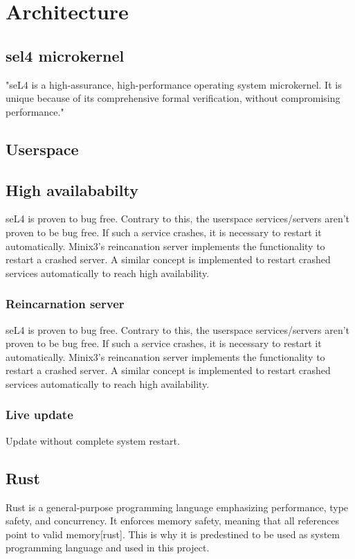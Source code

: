 \section{Architecture}


\subsection{sel4 microkernel}
"seL4 is a high-assurance, high-performance operating system microkernel. It is unique because of its comprehensive formal verification, without compromising performance." \cite{seL4:2024}

\subsection{Userspace}

\subsection{High availababilty}
seL4 is proven to bug free. Contrary to this, the userspace services/servers aren't proven to be bug free. If such a service crashes, it is necessary to restart it automatically.
Minix3's reincanation server \cite{minix3:2010} implements the functionality to restart a crashed server. A similar concept is implemented to restart crashed services automatically to reach 
high availability.

\subsubsection{Reincarnation server}
seL4 is proven to bug free. Contrary to this, the userspace services/servers aren't proven to be bug free. If such a service crashes, it is necessary to restart it automatically.
Minix3's reincanation server \cite{minix3:2010} implements the functionality to restart a crashed server. A similar concept is implemented to restart crashed services automatically to reach 
high availability.

\subsubsection{Live update}
Update without complete system restart.

\subsection{Rust}
Rust is a general-purpose programming language emphasizing performance, type safety, and concurrency. It enforces memory safety, meaning that all references point to valid memory[rust]. 
This is why it is predestined to be used as system programming language and used in this project.
